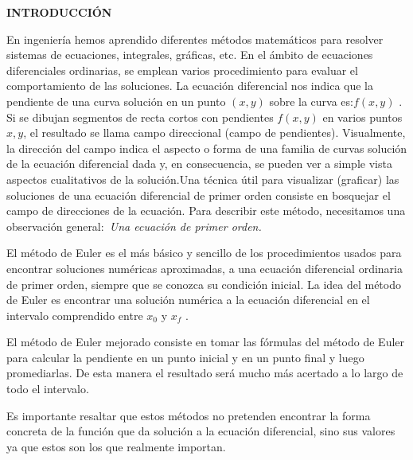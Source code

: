 \documentclass[12 pt,letterpaper]{article}
\begin{document}
	\centering
	\textbf{\LARGE{INTRODUCCI\'ON }}
	
	
	\justify 
   En ingeniería hemos aprendido diferentes métodos matemáticos para resolver sistemas de ecuaciones, integrales, gráficas, etc. En el ámbito de ecuaciones diferenciales ordinarias, se emplean varios procedimiento para evaluar el comportamiento de las soluciones. La ecuación diferencial nos indica que la pendiente de una curva solución en un punto {$(x, y)$} sobre la curva es:{$ f(x, y)$}  . Si se dibujan segmentos de recta cortos con pendientes {$ f(x, y)$} en varios puntos  {$x, y$}, el resultado se llama campo direccional (campo de pendientes). Visualmente, la dirección del campo indica el aspecto o forma de una familia de curvas solución de la ecuación diferencial dada y, en consecuencia, se pueden ver a simple vista aspectos cualitativos de la solución.Una técnica útil para visualizar (graficar) las soluciones de una ecuación diferencial de primer orden consiste en bosquejar el campo de direcciones de la ecuación. Para describir este método, necesitamos una observación general:{\itshape\ Una ecuación de primer orden.}\vspace{0.4Cm}
 
	El método de Euler es el más básico y sencillo de los procedimientos usados para encontrar soluciones numéricas aproximadas, a una ecuación diferencial ordinaria de primer orden, siempre que se conozca su condición inicial. La idea del método de Euler es encontrar una solución numérica a la ecuación diferencial en el intervalo comprendido entre {$x_{0} $} y {$x_{f} $} .	\vspace{0.4Cm}

	El método de Euler mejorado consiste en tomar las fórmulas del método de Euler para calcular la pendiente en un punto inicial y en un punto final y luego promediarlas. De esta manera el resultado será mucho más acertado a lo largo de todo el intervalo.\vspace{0.4Cm}
	
	Es importante resaltar que estos métodos no pretenden encontrar la forma concreta de la función que da solución a la ecuación diferencial, sino sus valores ya que estos son los que realmente importan.\vspace{0.4Cm}
\newpage
	
	
	\flushleft\section{\fbox{\textcolor{violet}{Aplicaciones}}}
	
\end{document}
